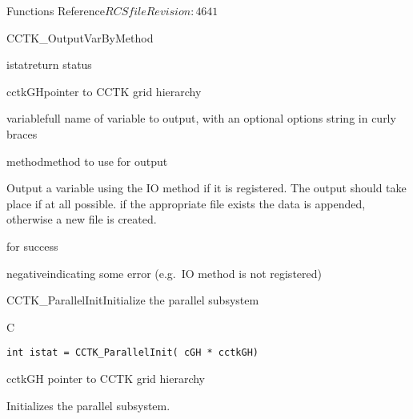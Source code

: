 \begin{cactuspart}{ Functions Reference}{$RCSfile$}{$Revision: 4641 $}
\begin{FunctionDescription}{CCTK\_OutputVarByMethod}
\begin{ParameterSection}
\begin{Parameter}{istat}return status\end{Parameter}
\begin{Parameter}{cctkGH}pointer to CCTK grid hierarchy\end{Parameter}
\begin{Parameter}{variable}full name of variable to output, with an optional
options string in curly braces\end{Parameter}
\begin{Parameter}{method}method to use for output\end{Parameter}
\end{ParameterSection}

\begin{Discussion}
Output a variable  using the IO method  if it is
registered. The output should take place if at all possible.
if the appropriate file exists the data is appended, otherwise a new
file is created.
\end{Discussion}

\begin{ErrorSection}
\begin{Error}{0}for success\end{Error}
\begin{Error}{negative}indicating some error (e.g.\ IO method is not registered)\end{Error}
\end{ErrorSection}
\end{FunctionDescription}




\begin{FunctionDescription}{CCTK\_ParallelInit}{Initialize the parallel subsystem}
\label{CCTK-ParallelInit}
\begin{SynopsisSection}
\begin{Synopsis}{C}
\begin{verbatim}int istat = CCTK_ParallelInit( cGH * cctkGH)\end{verbatim}
\end{Synopsis}
\end{SynopsisSection}
\begin{ParameterSection}
\begin{Parameter}{cctkGH}
pointer to CCTK grid hierarchy
\end{Parameter}
\end{ParameterSection}
\begin{Discussion}
Initializes the parallel subsystem.
\end{Discussion}
\end{FunctionDescription}



\end{cactuspart}
